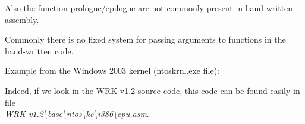 Also the function prologue/epilogue are not commonly present in hand-written assembly.
\par

Commonly there is no fixed system for passing arguments to functions in the hand-written code.

\par
Example from the Windows 2003 kernel 
(ntoskrnl.exe file):



Indeed, if we look in the 
\ac{WRK} v1.2 source code, this code
can be found easily in file \\
\emph{WRK-v1.2\textbackslash{}base\textbackslash{}ntos\textbackslash{}ke\textbackslash{}i386\textbackslash{}cpu.asm}.
